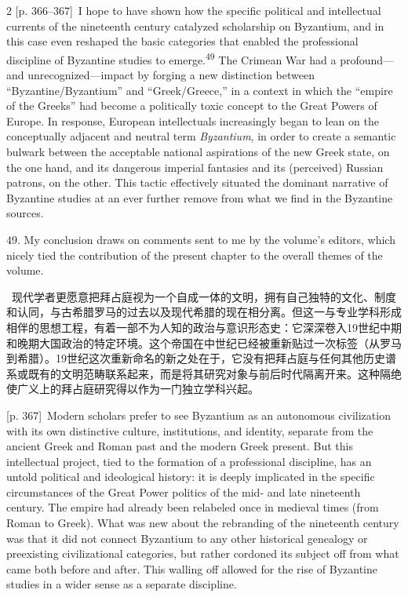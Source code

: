 \documentclass[10pt,a4paper]{article}
\begin{document}
\begin{paracol}{2}
\switchcolumn
{\scriptsize\color{gray}[p. 366–367]}\ I hope to have shown how the specific political and intellectual currents of the nineteenth century catalyzed scholarship on Byzantium, and in this case even reshaped the basic categories that enabled the professional discipline of Byzantine studies to emerge.\nobreak\textsuperscript{49} The Crimean War had a profound—and unrecognized—impact by forging a new distinction between “Byzantine/Byzantium” and “Greek/Greece,” in a context in which the “empire of the Greeks” had become a politically toxic concept to the Great Powers of Europe. In response, European intellectuals increasingly began to lean on the conceptually adjacent and neutral term \textit{Byzantium}, in order to create a semantic bulwark between the acceptable national aspirations of the new Greek state, on the one hand, and its dangerous imperial fantasies and its (perceived) Russian patrons, on the other. This tactic effectively situated the dominant narrative of Byzantine studies at an ever further remove from what we find in the Byzantine sources.\par{\small 49. My conclusion draws on comments sent to me by the volume’s editors, which nicely tied the contribution of the present chapter to the overall themes of the volume.\par}
\switchcolumn*
{\scriptsize\color{gray}[p. 367]}\ 现代学者更愿意把拜占庭视为一个自成一体的文明，拥有自己独特的文化、制度和认同，与古希腊罗马的过去以及现代希腊的现在相分离。但这一与专业学科形成相伴的思想工程，有着一部不为人知的政治与意识形态史：它深深卷入19世纪中期和晚期大国政治的特定环境。这个帝国在中世纪已经被重新贴过一次标签（从罗马到希腊）。19世纪这次重新命名的新之处在于，它没有把拜占庭与任何其他历史谱系或既有的文明范畴联系起来，而是将其研究对象与前后时代隔离开来。这种隔绝使广义上的拜占庭研究得以作为一门独立学科兴起。\par
\switchcolumn
{\scriptsize\color{gray}[p. 367]}\ Modern scholars prefer to see Byzantium as an autonomous civilization with its own distinctive culture, institutions, and identity, separate from the ancient Greek and Roman past and the modern Greek present. But this intellectual project, tied to the formation of a professional discipline, has an untold political and ideological history: it is deeply implicated in the specific circumstances of the Great Power politics of the mid- and late nineteenth century. The empire had already been relabeled once in medieval times (from Roman to Greek). What was new about the rebranding of the nineteenth century was that it did not connect Byzantium to any other historical genealogy or preexisting civilizational categories, but rather cordoned its subject off from what came both before and after. This walling off allowed for the rise of Byzantine studies in a wider sense as a separate discipline.\par
\switchcolumn*
\end{paracol}
\end{document}
